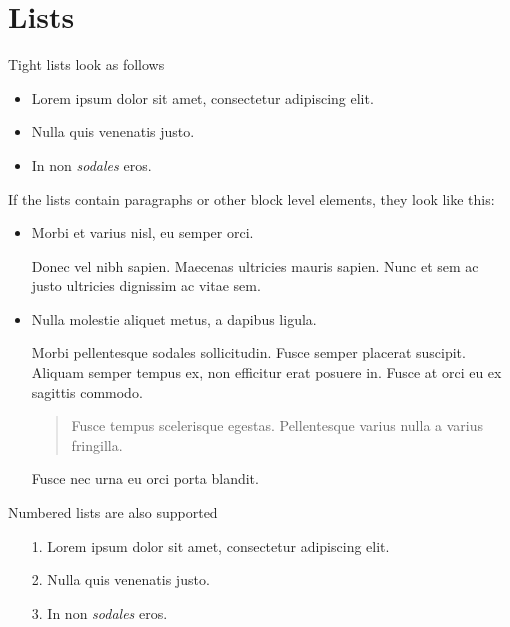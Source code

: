 \section{Lists}



\label{932242378642137797}{}


Tight lists look as follows



\begin{itemize}
\item Lorem ipsum dolor sit amet, consectetur adipiscing elit.


\item Nulla quis venenatis justo.


\item In non \emph{sodales} eros.

\end{itemize}


If the lists contain paragraphs or other block level elements, they look like this:



\begin{itemize}
\item Morbi et varius nisl, eu semper orci.

Donec vel nibh sapien. Maecenas ultricies mauris sapien. Nunc et sem ac justo ultricies dignissim ac vitae sem.


\item Nulla molestie aliquet metus, a dapibus ligula.

Morbi pellentesque sodales sollicitudin. Fusce semper placerat suscipit. Aliquam semper tempus ex, non efficitur erat posuere in. Fusce at orci eu ex sagittis commodo.

\begin{quote}
Fusce tempus scelerisque egestas. Pellentesque varius nulla a varius fringilla.

\end{quote}
Fusce nec urna eu orci porta blandit.

\end{itemize}


Numbered lists are also supported



\begin{itemize}
\item[1. ] Lorem ipsum dolor sit amet, consectetur adipiscing elit.


\item[2. ] Nulla quis venenatis justo.


\item[3. ] In non \emph{sodales} eros.

\end{itemize}



